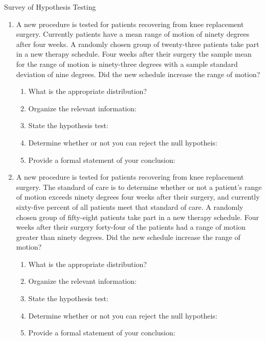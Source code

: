 \documentclass[12pt]{article}
\begin{document}
Survey of Hypothesis Testing

\begin{enumerate}
\item A new procedure is tested for patients recovering from knee
  replacement surgery. Currently patients have a mean range of motion
  of ninety degrees after four weeks. A randomly chosen group of
  twenty-three patients take part in a new therapy schedule. Four
  weeks after their surgery the sample mean for the range of motion is
  ninety-three degrees with a sample standard deviation of nine
  degrees. Did the new schedule increase the range of motion?

  \begin{enumerate}
  \item What is the appropriate distribution? 
  \item Organize the relevant information: \\ [30pt]
  \item State the hypothesis test: \\ [20pt]
  \item Determine whether or not you can reject the null hypotheis:
    \vfill
  \item Provide a formal statement of your conclusion: 
  \end{enumerate}

\clearpage

\item A new procedure is tested for patients recovering from knee
  replacement surgery. The standard of care is to determine whether or
  not a patient's range of motion exceeds ninety degrees four weeks
  after their surgery, and currently sixty-five percent of all
  patients meet that standard of care. A randomly chosen group of
  fifty-eight patients take part in a new therapy schedule. Four weeks
  after their surgery forty-four of the patients had a range of motion
  greater than ninety degrees. Did the new schedule increase the range
  of motion?

  \begin{enumerate}
  \item What is the appropriate distribution? 
  \item Organize the relevant information: \\ [30pt]
  \item State the hypothesis test: \\ [20pt]
  \item Determine whether or not you can reject the null hypotheis:
    \vfill
  \item Provide a formal statement of your conclusion: 
  \end{enumerate}


\end{enumerate}
\end{document}
